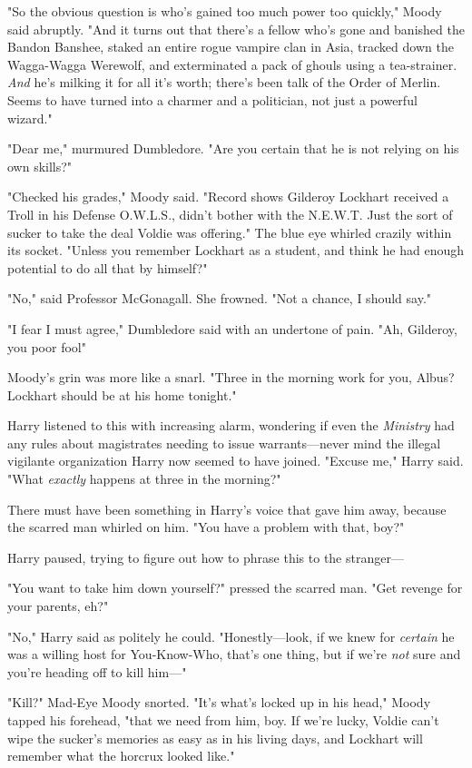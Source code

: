 "So the obvious question is who's gained too much power too quickly," Moody
said abruptly. "And it turns out that there's a fellow who's gone and banished
the Bandon Banshee, staked an entire rogue vampire clan in Asia, tracked down
the Wagga-Wagga Werewolf, and exterminated a pack of ghouls using a
tea-strainer. \emph{And} he's milking it for all it's worth; there's been talk
of the Order of Merlin. Seems to have turned into a charmer and a politician,
not just a powerful wizard."

"Dear me," murmured Dumbledore. "Are you certain that he is not relying on his
own skills?"

"Checked his grades," Moody said. "Record shows Gilderoy Lockhart received a
Troll in his Defense O.W.L.S., didn't bother with the N.E.W.T. Just the sort of
sucker to take the deal Voldie was offering." The blue eye whirled crazily
within its socket. "Unless you remember Lockhart as a student, and think he had
enough potential to do all that by himself?"

"No," said Professor McGonagall. She frowned. "Not a chance, I should say."

"I fear I must agree," Dumbledore said with an undertone of pain. "Ah,
Gilderoy, you poor fool{\el}"

Moody's grin was more like a snarl. "Three in the morning work for you, Albus?
Lockhart should be at his home tonight."

Harry listened to this with increasing alarm, wondering if even the
\emph{Ministry} had any rules about magistrates needing to issue
warrants—never mind the illegal vigilante organization Harry now seemed to
have joined. "Excuse me," Harry said. "What \emph{exactly} happens at three in
the morning?"

There must have been something in Harry's voice that gave him away, because the
scarred man whirled on him. "You have a problem with that, boy?"

Harry paused, trying to figure out how to phrase this to the stranger—

"You want to take him down yourself?" pressed the scarred man. "Get revenge for
your parents, eh?"

"No," Harry said as politely he could. "Honestly—look, if we knew for
\emph{certain} he was a willing host for You-Know-Who, that's one thing, but if
we're \emph{not} sure and you're heading off to kill him—"

"Kill?" Mad-Eye Moody snorted. "It's what's locked up in his head," Moody
tapped his forehead, "that we need from him, boy. If we're lucky, Voldie can't
wipe the sucker's memories as easy as in his living days, and Lockhart will
remember what the horcrux looked like."

